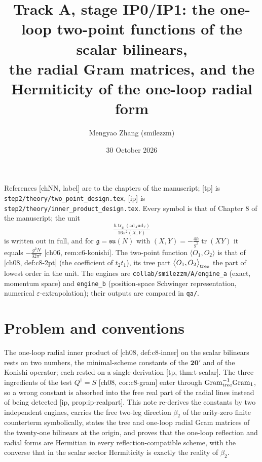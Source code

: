 \documentclass[11pt]{article}
\title{Track A, stage IP0/IP1: the one-loop two-point functions of the scalar bilinears,\\ the radial Gram matrices, and the Hermiticity of the one-loop radial form}
\author{Mengyao Zhang (smilezzm)}
\date{30 October 2026}
\theoremstyle{plain}
\theoremstyle{definition}
\numberwithin{equation}{section}
\newcommand{\unit}{\tfrac{\hbar\operatorname{tr}_{\mathfrak g}(\mathrm{ad}_X\mathrm{ad}_Y)}{16\pi^2(X,Y)}}
\newcommand{\TP}[2]{\big\langle #1,#2\big\rangle}
\newcommand{\TPz}[2]{\big\langle #1,#2\big\rangle_{\rm tree}}
\newcommand{\Gt}{\mathrm{Gram}_{\rm tree}}
\newcommand{\Go}{\mathrm{Gram}_1}
\begin{document}
\maketitle

\noindent References [chNN, label] are to the chapters of the manuscript; [tp] is \texttt{step2/theory/two\_point\_design.tex}, [ip] is \texttt{step2/theory/inner\_product\_design.tex}. Every symbol is that of Chapter 8 of the manuscript; the unit
\[
\unit
\]
is written out in full, and for $\mathfrak g=\mathfrak{su}(N)$ with $(X,Y)=-\tfrac{4\hbar}{g^2}\operatorname{tr}(XY)$ it equals $-\tfrac{g^2N}{32\pi^2}$ [ch06, rem:c6-konishi]. The two-point function $\TP{O_1}{O_2}$ is that of [ch08, def:c8-2pt] (the coefficient of $t_2t_1$), its tree part $\TPz{O_1}{O_2}$ the part of lowest order in the unit. The engines are \texttt{collab/smilezzm/A/engine\_a} (exact, momentum space) and \texttt{engine\_b} (position-space Schwinger representation, numerical $\varepsilon$-extrapolation); their outputs are compared in \texttt{qa/}.

\section{Problem and conventions}

The one-loop radial inner product of [ch08, def:c8-inner] on the scalar bilinears rests on two numbers, the minimal-scheme constants of the $\mathbf{20'}$ and of the Konishi operator; each rested on a single derivation [tp, thm:t-scalar]. The three ingredients of the test $Q^\dagger=S$ [ch08, cor:c8-gram] enter through $\Gt^{-1}\Go$, so a wrong constant is absorbed into the free real part of the radial lines instead of being detected [ip, prop:ip-realpart]. This note re-derives the constants by two independent engines, carries the free two-leg direction $\beta_2$ of the arity-zero finite counterterm symbolically, states the tree and one-loop radial Gram matrices of the twenty-one bilinears at the origin, and proves that the one-loop reflection and radial forms are Hermitian in every reflection-compatible scheme, with the converse that in the scalar sector Hermiticity is exactly the reality of $\beta_2$.
\end{document}
